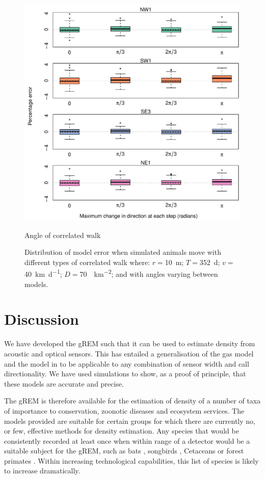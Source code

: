 \documentclass[a4paper,10pt,reqno,oneside]{amsart}
\begin{document}
\begin{figure}[t]
                \centering
		\includegraphics[width=1\textwidth]{imgs/ResultsTort.pdf}
                \caption{Angle of correlated walk}
                \label{f:Tort}
	\caption{Distribution of model error when simulated animals move with different types of correlated walk where:  $r = $\SI{10}{\meter}; $T = $\SI{352}{\day}; $v = $ \SI{40}{\kilo\meter\per\day}; $D=$\SI{70}{\animals\per\kilo\meter\squared}; and with angles varying between models. } 
\end{figure}

                  
                  
\section{Discussion}


We have developed the gREM such that it can be used to estimate density from acoustic and optical sensors. This has entailed a generalisation of the gas model and the model in \cite{rowcliffe2008estimating} to be applicable to any combination of sensor width and call directionality. We have used simulations to show, as a proof of principle, that these models are accurate and precise.

The gREM is therefore available for the estimation of density of a number of taxa of importance to conservation, zoonotic diseases and ecosystem services. The models provided are suitable for certain groups for which there are currently no, or few, effective methods for density estimation. Any species that would be consistently recorded at least once when within range of a detector would be a suitable subject for the gREM, such as bats \citep{kunz2009methods}, songbirds \citep{buckland2006point}, Cetaceans \citep{marques2009estimating} or forest primates \citep{hassel2008reliable}. Within increasing technological capabilities, this list of species is likely to increase dramatically.
\end{document}
